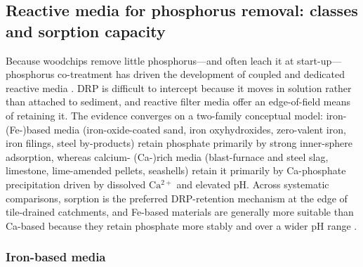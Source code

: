 \subsection{Reactive media for phosphorus removal: classes and sorption capacity}

Because woodchips remove little phosphorus---and often leach it at start-up---phosphorus co-treatment has driven the development of coupled and dedicated reactive media \parencite{Christianson2021}. DRP is difficult to intercept because it moves in solution rather than attached to sediment, and reactive filter media offer an edge-of-field means of retaining it. The evidence converges on a two-family conceptual model: iron- (Fe-)based media (iron-oxide-coated sand, iron oxyhydroxides, zero-valent iron, iron filings, steel by-products) retain phosphate primarily by strong inner-sphere adsorption, whereas calcium- (Ca-)rich media (blast-furnace and steel slag, limestone, lime-amended pellets, seashells) retain it primarily by Ca-phosphate precipitation driven by dissolved $\mathrm{Ca^{2+}}$ and elevated pH. Across systematic comparisons, sorption is the preferred DRP-retention mechanism at the edge of tile-drained catchments, and Fe-based materials are generally more suitable than Ca-based because they retain phosphate more stably and over a wider pH range \parencite{Mendes2022,Li2020}.

\subsubsection{Iron-based media}

